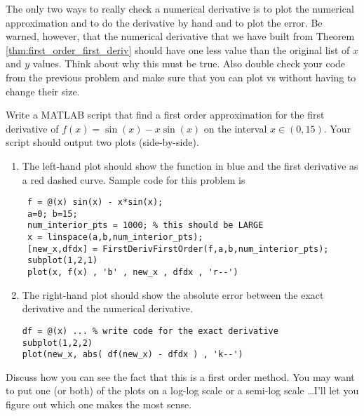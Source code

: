 The only two ways to really check a numerical derivative is to plot the numerical
approximation and to do the derivative by hand and to plot the error. Be warned, however,
that the numerical derivative that we have built from Theorem
\ref{thm:first_order_first_deriv} should have one less value than the
original list of $x$ and $y$ values.  Think about why this must be true. Also double check
your code from the previous problem and make sure that you can plot  vs
 without having to change their size.  

\begin{problem}
    Write a MATLAB script that find a first order approximation for the first derivative
    of $f(x) = \sin(x) - x\sin(x)$ on the interval $x \in (0,15)$.  Your script should
    output two plots (side-by-side). 
    \begin{enumerate}
        \item The left-hand plot should show the function in blue and the first derivative
            as a red dashed curve. Sample code for this problem is
\begin{lstlisting}
 f = @(x) sin(x) - x*sin(x);
 a=0; b=15;
 num_interior_pts = 1000; % this should be LARGE
 x = linspace(a,b,num_interior_pts);
 [new_x,dfdx] = FirstDerivFirstOrder(f,a,b,num_interior_pts);
 subplot(1,2,1)
 plot(x, f(x) , 'b' , new_x , dfdx , 'r--')
\end{lstlisting}
        \item The right-hand plot should show the absolute error between the exact derivative and
            the numerical derivative.
\begin{lstlisting}
df = @(x) ... % write code for the exact derivative
subplot(1,2,2)
plot(new_x, abs( df(new_x) - dfdx ) , 'k--')
\end{lstlisting}
    \end{enumerate}
    Discuss how you can see the fact that this is a first order method.  You may want to
    put one (or both) of the plots on a log-log scale or a semi-log scale \ldots I'll let
    you figure out which one makes the most sense.
\end{problem}


% 

